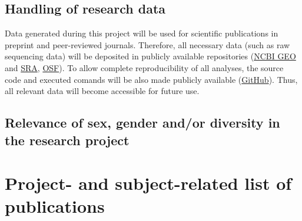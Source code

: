 \documentclass{scrartcl}
\begin{document}
\subsection{Handling of research data}
Data generated during this project will be used for scientific publications in
preprint and peer-reviewed journals. Therefore, all necessary data (such as raw
sequencing data) will be deposited in publicly available repositories
(\href{https://www.ncbi.nlm.nih.gov/geo/}{NCBI GEO} and
\href{https://www.ncbi.nlm.nih.gov/sra}{SRA}, \href{https://osf.io/}{OSF}). To
allow complete reproducibility of all analyses, the source code and executed
comands will be also made publicly available
(\href{https://github.com/}{GitHub}).  Thus, all relevant data will become
accessible for future use. 

\subsection{Relevance of sex, gender and/or diversity in the research project}

\section{Project- and subject-related list of publications}
\label{sec:bib}
\printbibliography[notcategory=reviewed, notcategory=nonreviewed, notcategory=patents_pending, notcategory=patents, heading=none, env=bibliographyNUM]	

\backmatter
\end{document}
